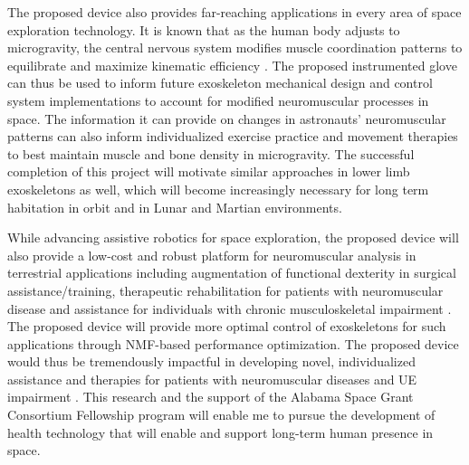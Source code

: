 \documentclass{article}
\begin{document}
The proposed device also provides far-reaching applications in every area of space exploration technology. It is known that as the human body adjusts to microgravity, the central nervous system modifies muscle coordination patterns to equilibrate and maximize kinematic efficiency \cite{Massion1992StrategyAS}. The proposed instrumented glove can thus be used to inform future exoskeleton mechanical design and control system implementations to account for modified neuromuscular processes in space. The information it can provide on changes in astronauts’ neuromuscular patterns can also inform individualized exercise practice and movement therapies to best maintain muscle and bone density in microgravity. The successful completion of this project will motivate similar approaches in lower limb exoskeletons as well, which will become increasingly necessary for long term habitation in orbit and in Lunar and Martian environments.

While advancing assistive robotics for space exploration, the proposed device will also provide a low-cost and robust platform for neuromuscular analysis in terrestrial applications including augmentation of functional dexterity in surgical assistance/training, therapeutic rehabilitation for patients with neuromuscular disease and assistance for individuals with chronic musculoskeletal impairment \cite{Rose2019HybridRH}. The proposed device will provide more optimal control of exoskeletons for such applications through NMF-based performance optimization. The proposed device would thus be tremendously impactful in developing novel, individualized assistance and therapies for patients with neuromuscular diseases and UE impairment \cite{Rose2019HybridRH,Overduin2008ModulationOM}. This research and the support of the Alabama Space Grant Consortium Fellowship program will enable me to pursue the development of health technology that will enable and support long-term human presence in space.

{\footnotesize

}
\end{document}
